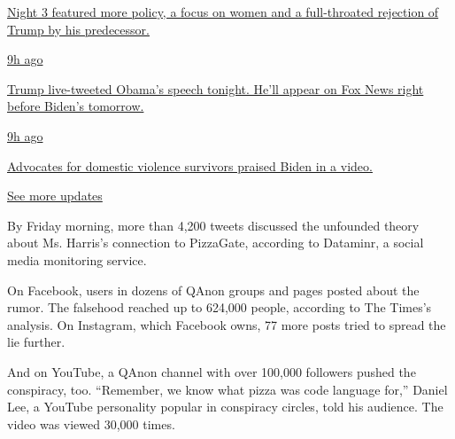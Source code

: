 \href{https://www.nytimes3xbfgragh.onion/live/2020/08/19/us/dnc-convention-election?action=click\&pgtype=Article\&state=default\&region=MAIN_CONTENT_1\&context=storylines_live_updates\#night-3-featured-more-policy-a-focus-on-women-and-a-full-throated-rejection-of-trump-by-his-predecessor}{Night
3 featured more policy, a focus on women and a full-throated rejection
of Trump by his predecessor.}

\href{https://www.nytimes3xbfgragh.onion/live/2020/08/19/us/dnc-convention-election?action=click\&pgtype=Article\&state=default\&region=MAIN_CONTENT_1\&context=storylines_live_updates\#trump-live-tweeted-obamas-speech-tonight-hell-appear-on-fox-news-right-before-bidens-tomorrow}{9h
ago}

\href{https://www.nytimes3xbfgragh.onion/live/2020/08/19/us/dnc-convention-election?action=click\&pgtype=Article\&state=default\&region=MAIN_CONTENT_1\&context=storylines_live_updates\#trump-live-tweeted-obamas-speech-tonight-hell-appear-on-fox-news-right-before-bidens-tomorrow}{Trump
live-tweeted Obama's speech tonight. He'll appear on Fox News right
before Biden's tomorrow.}

\href{https://www.nytimes3xbfgragh.onion/live/2020/08/19/us/dnc-convention-election?action=click\&pgtype=Article\&state=default\&region=MAIN_CONTENT_1\&context=storylines_live_updates\#advocates-for-domestic-violence-survivors-praised-biden-in-a-video}{9h
ago}

\href{https://www.nytimes3xbfgragh.onion/live/2020/08/19/us/dnc-convention-election?action=click\&pgtype=Article\&state=default\&region=MAIN_CONTENT_1\&context=storylines_live_updates\#advocates-for-domestic-violence-survivors-praised-biden-in-a-video}{Advocates
for domestic violence survivors praised Biden in a video.}

\href{https://www.nytimes3xbfgragh.onion/live/2020/08/19/us/dnc-convention-election?action=click\&pgtype=Article\&state=default\&region=MAIN_CONTENT_1\&context=storylines_live_updates}{See
more updates}

By Friday morning, more than 4,200 tweets discussed the unfounded theory
about Ms. Harris's connection to PizzaGate, according to Dataminr, a
social media monitoring service.

On Facebook, users in dozens of QAnon groups and pages posted about the
rumor. The falsehood reached up to 624,000 people, according to The
Times's analysis. On Instagram, which Facebook owns, 77 more posts tried
to spread the lie further.

And on YouTube, a QAnon channel with over 100,000 followers pushed the
conspiracy, too. ``Remember, we know what pizza was code language for,''
Daniel Lee, a YouTube personality popular in conspiracy circles, told
his audience. The video was viewed 30,000 times.

